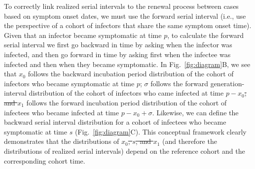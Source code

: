 \documentclass[12pt]{article}
\newcommand{\fref}[1]{Fig.~\ref{fig:#1}}
\newcommand{\psymp}{\ensuremath{p}} %
\newcommand{\ssymp}{\ensuremath{s}} %
\newcommand{\gtime}{\sigma} %
\providecommand{\DIFaddtex}[1]{{\protect\color{blue}\uwave{#1}}} %
\providecommand{\DIFdeltex}[1]{{\protect\color{red}\sout{#1}}}                      %
\providecommand{\DIFaddbegin}{} %
\providecommand{\DIFaddend}{} %
\providecommand{\DIFdelbegin}{} %
\providecommand{\DIFdelend}{} %
\providecommand{\DIFadd}[1]{\texorpdfstring{\DIFaddtex{#1}}{#1}} %
\providecommand{\DIFdel}[1]{\texorpdfstring{\DIFdeltex{#1}}{}} %
\newcommand{\DIFscaledelfig}{0.5}
\newlength{\DIFdelgraphicswidth} %
\newlength{\DIFdelgraphicsheight} %
\newcommand{\DIFaddincludegraphics}[2][]{{\color{blue}\fbox{\DIFOincludegraphics[#1]{#2}}}} %
\newcommand{\DIFdelincludegraphics}[2][]{%
\sbox{\DIFdelgraphicsbox}{\DIFOincludegraphics[#1]{#2}}%
\settoboxwidth{\DIFdelgraphicswidth}{\DIFdelgraphicsbox} %
\settoboxtotalheight{\DIFdelgraphicsheight}{\DIFdelgraphicsbox} %
\scalebox{\DIFscaledelfig}{%
\parbox[b]{\DIFdelgraphicswidth}{\usebox{\DIFdelgraphicsbox}\\[-\baselineskip] \rule{\DIFdelgraphicswidth}{0em}}\llap{\resizebox{\DIFdelgraphicswidth}{\DIFdelgraphicsheight}{%
\setlength{\unitlength}{\DIFdelgraphicswidth}%
\begin{picture}(1,1)%
\thicklines\linethickness{2pt} %
{\color[rgb]{1,0,0}\put(0,0){\framebox(1,1){}}}%
{\color[rgb]{1,0,0}\put(0,0){\line( 1,1){1}}}%
{\color[rgb]{1,0,0}\put(0,1){\line(1,-1){1}}}%
\end{picture}%
}\hspace*{3pt}}} %
} %
\DeclareRobustCommand{\DIFaddbegin}{\DIFOaddbegin \let\includegraphics\DIFaddincludegraphics} %
\DeclareRobustCommand{\DIFaddend}{\DIFOaddend \let\includegraphics\DIFOincludegraphics} %
\DeclareRobustCommand{\DIFdelbegin}{\DIFOdelbegin \let\includegraphics\DIFdelincludegraphics} %
\DeclareRobustCommand{\DIFdelend}{\DIFOaddend \let\includegraphics\DIFOincludegraphics} %
\begin{document}
To correctly link realized serial intervals to the renewal process between cases based on symptom onset dates, we must use the forward serial interval (i.e., use the perspective of a cohort of infectors that share the same symptom onset time). 
Given that an infector became symptomatic at time $\psymp$, to calculate the forward serial interval we first go backward in time by asking when the infector was infected, and then go forward in time by asking first when the infectee was infected and then when they became symptomatic.
In \fref{diagram}B, we see that \DIFdelbegin \DIFdel{$x_0$ }\DIFdelend \DIFaddbegin \DIFadd{$x_1$ }\DIFaddend follows the backward incubation period distribution of the cohort of infectors who became symptomatic at time $\psymp$;
$\gtime$ follows the forward generation-interval distribution of the cohort of infectors who came infected at time \DIFdelbegin \DIFdel{$\psymp - x_0$;
and $x_1$ }\DIFdelend \DIFaddbegin \DIFadd{$\psymp - x_1$;
and $x_2$ }\DIFaddend follows the forward incubation period distribution of the cohort of infectees who became infected at time \DIFdelbegin \DIFdel{$\psymp - x_0 + \gtime$}\DIFdelend \DIFaddbegin \DIFadd{$\psymp - x_1 + \gtime$}\DIFaddend .
Likewise, we can define the backward serial interval distribution for a cohort of infectees who became symptomatic at time $\ssymp$ (\fref{diagram}C).
This conceptual framework clearly demonstrates that the distributions of \DIFdelbegin \DIFdel{$x_0$, $\ssymp$, and $x_1$ }\DIFdelend \DIFaddbegin \DIFadd{$x_1$, $\gtime$, and $x_2$ }\DIFaddend (and therefore the distributions of realized serial intervals) depend on the reference cohort and the corresponding cohort time.
\end{document}
